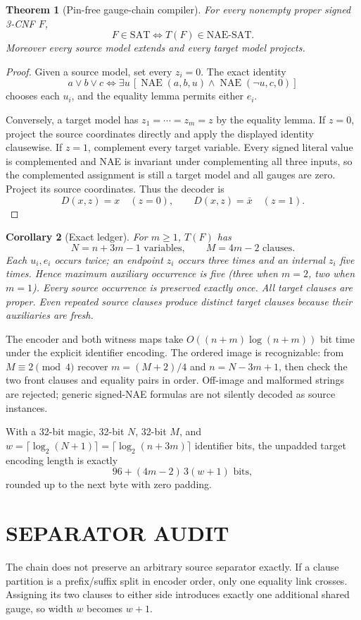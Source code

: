 \documentclass[11pt]{article}
\newtheorem{theorem}{Theorem}
\newtheorem{corollary}[theorem]{Corollary}
\begin{document}
\begin{theorem}[Pin-free gauge-chain compiler]
For every nonempty proper signed 3-CNF $F$,
\[\boxed{F\in\mathrm{SAT}\iff T(F)\in\mathrm{NAE\mbox{-}SAT}.}\]
Moreover every source model extends and every target model projects.
\end{theorem}
\begin{proof}
Given a source model, set every $z_i=0$.  The exact identity
\[
a\vee b\vee c\iff
\exists u\,[\operatorname{NAE}(a,b,u)\wedge
\operatorname{NAE}(\neg u,c,0)]
\]
chooses each $u_i$, and the equality lemma permits either $e_i$.

Conversely, a target model has $z_1=\cdots=z_m=z$ by the equality lemma.  If
$z=0$, project the source coordinates directly and apply the displayed
identity clausewise.  If $z=1$, complement every target variable.  Every
signed literal value is complemented and NAE is invariant under complementing
all three inputs, so the complemented assignment is still a target model and
all gauges are zero.  Project its source coordinates.  Thus the decoder is
\[D(x,z)=x\quad(z=0),\qquad D(x,z)=\bar x\quad(z=1).
\]
\end{proof}

\begin{corollary}[Exact ledger]
For $m\ge1$, $T(F)$ has
\[
\boxed{N=n+3m-1\text{ variables},\qquad M=4m-2\text{ clauses}.}
\]
Each $u_i,e_i$ occurs twice; an endpoint $z_i$ occurs three times and an
internal $z_i$ five times.  Hence maximum auxiliary occurrence is five
(three when $m=2$, two when $m=1$).  Every source occurrence is preserved
exactly once.  All target clauses are proper.  Even repeated source clauses
produce distinct target clauses because their auxiliaries are fresh.
\end{corollary}

The encoder and both witness maps take $O((n+m)\log(n+m))$ bit time under the
explicit identifier encoding.  The ordered image is recognizable: from
$M\equiv2\pmod4$ recover $m=(M+2)/4$ and
$n=N-3m+1$, then check the two front clauses and equality pairs in order.
Off-image and malformed strings are rejected; generic signed-NAE formulas are
not silently decoded as source instances.

With a 32-bit magic, 32-bit $N$, 32-bit $M$, and
$w=\lceil\log_2(N+1)\rceil=\lceil\log_2(n+3m)\rceil$ identifier bits, the
unpadded target encoding length is exactly
\[
\boxed{96+(4m-2)\,3(w+1)\text{ bits},}
\]
rounded up to the next byte with zero padding.

\section{SEPARATOR AUDIT}
The chain does not preserve an arbitrary source separator exactly.  If a
clause partition is a prefix/suffix split in encoder order, only one equality
link crosses.  Assigning its two clauses to either side introduces exactly one
additional shared gauge, so width $w$ becomes $w+1$.
\end{document}
